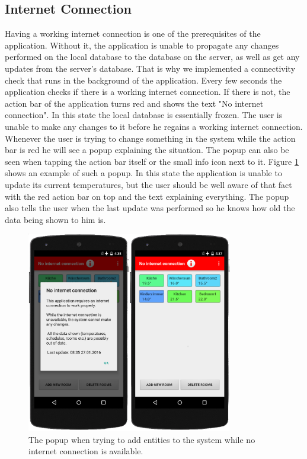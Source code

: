 \subsection{Internet Connection}

Having a working internet connection is one of the prerequisites of the application. Without it, the application is unable to propagate any changes performed on the local database to the database on the server, as well as get any updates from the server's database. That is why we implemented a connectivity check that runs in the background of the application. Every few seconds the application checks if there is a working internet connection. If there is not, the action bar of the application turns red and shows the text "No internet connection". In this state the local database is essentially frozen. The user is unable to make any changes to it before he regains a working internet connection. Whenever the user is trying to change something in the system while the action bar is red he will see a popup explaining the situation. The popup can also be seen when tapping the action bar itself or the small info icon next to it. Figure \ref{fig:no_internet} shows an example of such a popup. In this state the application is unable to update its current temperatures, but the user should be well aware of that fact with the red action bar on top and the text explaining everything. The popup also tells the user when the last update was performed so he knows how old the data being shown to him is. 

\begin{figure}
	\begin{center}
		\includegraphics[width=0.8\textwidth]{images/no_internet.png}
	\end{center}
	\caption{The popup when trying to add entities to the system while no internet connection is available.}
	\label{fig:no_internet}
\end{figure}

